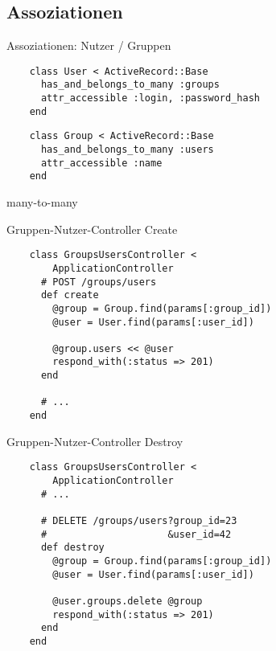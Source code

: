 \subsection{Assoziationen}

\begin{frame}[fragile]{Assoziationen: Nutzer / Gruppen}
  \begin{lstlisting}
    class User < ActiveRecord::Base
      has_and_belongs_to_many :groups
      attr_accessible :login, :password_hash
    end
  \end{lstlisting}

  \begin{lstlisting}
    class Group < ActiveRecord::Base
      has_and_belongs_to_many :users
      attr_accessible :name
    end
  \end{lstlisting}
\end{frame}

\begin{frame}{many-to-many}
  \begin{center}
    
  \end{center}
\end{frame}

\begin{frame}[fragile]{Gruppen-Nutzer-Controller Create}
  \begin{lstlisting}
    class GroupsUsersController < 
        ApplicationController
      # POST /groups/users
      def create
        @group = Group.find(params[:group_id])
        @user = User.find(params[:user_id])

        @group.users << @user
        respond_with(:status => 201)
      end

      # ...
    end
  \end{lstlisting}
\end{frame}

\begin{frame}[fragile]{Gruppen-Nutzer-Controller Destroy}
  \begin{lstlisting}
    class GroupsUsersController < 
        ApplicationController
      # ...

      # DELETE /groups/users?group_id=23
      #                     &user_id=42
      def destroy
        @group = Group.find(params[:group_id])
        @user = User.find(params[:user_id])

        @user.groups.delete @group
        respond_with(:status => 201)
      end
    end
  \end{lstlisting}
\end{frame}

